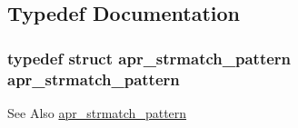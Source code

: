 \subsection{Typedef Documentation}
\hypertarget{group___a_p_r___util___str_match_gab7fc6f6d1b15c8d8750b4637b8ac5679}{
\subsubsection[{apr\-\_\-strmatch\-\_\-pattern}]{\setlength{\rightskip}{0pt plus 5cm}typedef struct {\bf apr\-\_\-strmatch\-\_\-pattern} {\bf apr\-\_\-strmatch\-\_\-pattern}}}\label{group___a_p_r___util___str_match_gab7fc6f6d1b15c8d8750b4637b8ac5679}
\begin{DoxySeeAlso}{See Also}
\hyperlink{structapr__strmatch__pattern}{apr\-\_\-strmatch\-\_\-pattern} 
\end{DoxySeeAlso}


